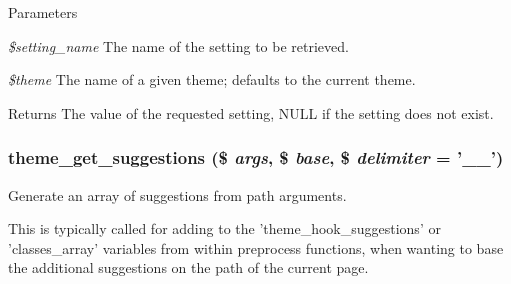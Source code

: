 \begin{DoxyParams}{Parameters}
\item[{\em \$setting\_\-name}]The name of the setting to be retrieved. \item[{\em \$theme}]The name of a given theme; defaults to the current theme.\end{DoxyParams}
\begin{DoxyReturn}{Returns}
The value of the requested setting, NULL if the setting does not exist. 
\end{DoxyReturn}
\hypertarget{includes_2theme_8inc_af13ff730d76e46395bc8bd8298bfa724}{
\subsubsection[{theme\_\-get\_\-suggestions}]{\setlength{\rightskip}{0pt plus 5cm}theme\_\-get\_\-suggestions (\$ {\em args}, \/  \$ {\em base}, \/  \$ {\em delimiter} = {\ttfamily '\_\-\_\-'})}}
\label{includes_2theme_8inc_af13ff730d76e46395bc8bd8298bfa724}
Generate an array of suggestions from path arguments.

This is typically called for adding to the 'theme\_\-hook\_\-suggestions' or 'classes\_\-array' variables from within preprocess functions, when wanting to base the additional suggestions on the path of the current page.


